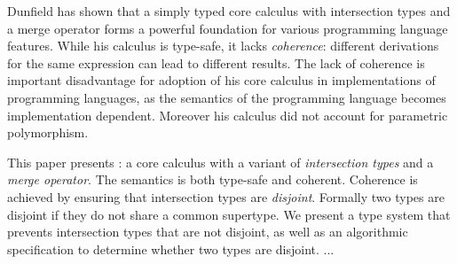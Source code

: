 Dunfield has shown that a simply typed core calculus with
intersection types and a merge operator forms a powerful foundation
for various programming language features. While his calculus
is type-safe, it lacks \emph{coherence}:
different derivations for the same expression can lead to different
results. The lack of coherence is important disadvantage for adoption
of his core calculus in implementations of programming languages, as
the semantics of the programming language becomes implementation
dependent. Moreover his calculus did not account for parametric polymorphism.

This paper presents \name: a core calculus with a variant of
\emph{intersection types} and a
\emph{merge operator}. The semantics \name is both type-safe and
coherent. Coherence is achieved by ensuring that intersection types
are \emph{disjoint}. Formally two types are disjoint if they do not
share a common supertype. We present a type system that prevents
intersection types that are not disjoint, as well as an algorithmic
specification to determine whether two types are disjoint. ...
